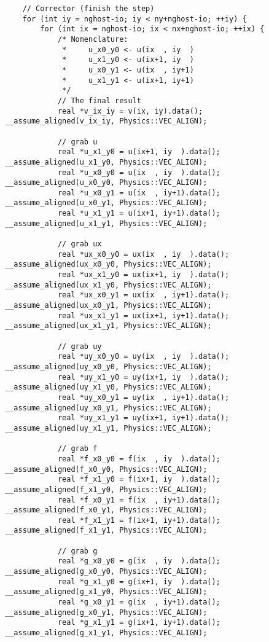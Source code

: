 {\tiny
\begin{lstlisting}
    // Corrector (finish the step)
    for (int iy = nghost-io; iy < ny+nghost-io; ++iy) {
        for (int ix = nghost-io; ix < nx+nghost-io; ++ix) {
            /* Nomenclature:
             *     u_x0_y0 <- u(ix  , iy  )
             *     u_x1_y0 <- u(ix+1, iy  )
             *     u_x0_y1 <- u(ix  , iy+1)
             *     u_x1_y1 <- u(ix+1, iy+1)
             */
            // The final result
            real *v_ix_iy = v(ix, iy).data();       __assume_aligned(v_ix_iy, Physics::VEC_ALIGN);

            // grab u
            real *u_x1_y0 = u(ix+1, iy  ).data();   __assume_aligned(u_x1_y0, Physics::VEC_ALIGN);
            real *u_x0_y0 = u(ix  , iy  ).data();   __assume_aligned(u_x0_y0, Physics::VEC_ALIGN);
            real *u_x0_y1 = u(ix  , iy+1).data();   __assume_aligned(u_x0_y1, Physics::VEC_ALIGN);
            real *u_x1_y1 = u(ix+1, iy+1).data();   __assume_aligned(u_x1_y1, Physics::VEC_ALIGN);

            // grab ux
            real *ux_x0_y0 = ux(ix  , iy  ).data(); __assume_aligned(ux_x0_y0, Physics::VEC_ALIGN);
            real *ux_x1_y0 = ux(ix+1, iy  ).data(); __assume_aligned(ux_x1_y0, Physics::VEC_ALIGN);
            real *ux_x0_y1 = ux(ix  , iy+1).data(); __assume_aligned(ux_x0_y1, Physics::VEC_ALIGN);
            real *ux_x1_y1 = ux(ix+1, iy+1).data(); __assume_aligned(ux_x1_y1, Physics::VEC_ALIGN);

            // grab uy
            real *uy_x0_y0 = uy(ix  , iy  ).data(); __assume_aligned(uy_x0_y0, Physics::VEC_ALIGN);
            real *uy_x1_y0 = uy(ix+1, iy  ).data(); __assume_aligned(uy_x1_y0, Physics::VEC_ALIGN);
            real *uy_x0_y1 = uy(ix  , iy+1).data(); __assume_aligned(uy_x0_y1, Physics::VEC_ALIGN);
            real *uy_x1_y1 = uy(ix+1, iy+1).data(); __assume_aligned(uy_x1_y1, Physics::VEC_ALIGN);

            // grab f
            real *f_x0_y0 = f(ix  , iy  ).data();   __assume_aligned(f_x0_y0, Physics::VEC_ALIGN);
            real *f_x1_y0 = f(ix+1, iy  ).data();   __assume_aligned(f_x1_y0, Physics::VEC_ALIGN);
            real *f_x0_y1 = f(ix  , iy+1).data();   __assume_aligned(f_x0_y1, Physics::VEC_ALIGN);
            real *f_x1_y1 = f(ix+1, iy+1).data();   __assume_aligned(f_x1_y1, Physics::VEC_ALIGN);

            // grab g
            real *g_x0_y0 = g(ix  , iy  ).data();   __assume_aligned(g_x0_y0, Physics::VEC_ALIGN);
            real *g_x1_y0 = g(ix+1, iy  ).data();   __assume_aligned(g_x1_y0, Physics::VEC_ALIGN);
            real *g_x0_y1 = g(ix  , iy+1).data();   __assume_aligned(g_x0_y1, Physics::VEC_ALIGN);
            real *g_x1_y1 = g(ix+1, iy+1).data();   __assume_aligned(g_x1_y1, Physics::VEC_ALIGN);


\end{lstlisting}}
